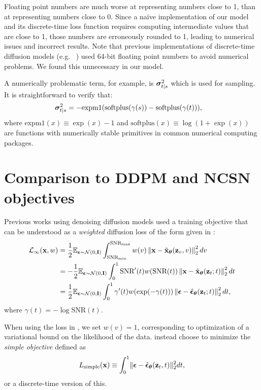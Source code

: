 \documentclass{article}
\newcommand{\bsst}{\bsigma_{t|s}}
\newcommand{\snr}{\text{SNR}}
\begin{document}
Floating point numbers are much worse at representing numbers close to 1, than at representing numbers close to 0. Since a na\"ive implementation of our model and its discrete-time loss function requires computing intermediate values that are close to 1, those numbers are erroneously rounded to 1, leading to numerical issues and incorrect results. Note that previous implementations of discrete-time diffusion models (e.g. ~\citep{ho2020denoising}) used 64-bit floating point numbers to avoid numerical problems. We found this unnecessary in our model.

A numerically problematic term, for example, is $\bsst^2$ which is used for sampling. It is straightforward to verify that:
\begin{align}
\bsst^2 &= -\text{expm1}(\text{softplus}(\gamma(s))-\text{softplus}(\gamma(t))),
\end{align}
where $\text{expm1}(x) \equiv \exp(x) - 1$ and $\text{softplus}(x) \equiv \log(1 + \exp(x))$ are functions with numerically stable primitives in common numerical computing packages. 

\section{Comparison to DDPM and NCSN objectives}
\label{sec:ncsn_ddpm_weights}
Previous works using denoising diffusion models \citep{ho2020denoising, song2019generative, nichol2021improved} used a training objective that can be understood as a \emph{weighted} diffusion loss of the form given in :
\begin{align}
\mathcal{L}_{\infty}(\rvx, w) &= \frac{1}{2}\E_{\bepsilon\sim\mathcal{N}(0,\bfI)} \int_{\snr_{\text{min}}}^{\snr_{\text{max}}} w(v) \left\rVert \rvx - \tilde{\rvx}_{\bT}(\rvz_v, v) \right\lVert_{2}^{2} dv \label{eq:weighted_diff_app}\\
&= -\frac{1}{2}\E_{\bepsilon\sim\mathcal{N}(0,\bfI)} \int_{0}^{1} \snr'(t)w(\snr(t)) \left\rVert \rvx - \hat{\rvx}_{\bT}(\rvz_t;t) \right\lVert_{2}^{2} dt\\
&= \frac{1}{2}\E_{\bepsilon\sim\mathcal{N}(0,\bfI)} \int_{0}^{1} \gamma'(t)w(\exp(-\gamma(t))) \left\rVert \bepsilon - \hat{\bepsilon}_{\bT}(\rvz_t;t) \right\lVert_{2}^{2} dt,\label{eq:weighted_gamma_loss}
\end{align}
where $\gamma(t)=-\log\snr(t)$.

When using the loss in , we set $w(v)=1$, corresponding to optimization of a variational bound on the likelihood of the data. \cite{ho2020denoising, song2019generative,nichol2021improved} instead choose to minimize the \emph{simple objective} defined as
\begin{align}
L_{\text{simple}}({\mathbf{x}}) \equiv \int_{0}^{1} \lVert {\boldsymbol{\epsilon}} - \hat{{\boldsymbol{\epsilon}}}_{{\boldsymbol{\theta}}}({\mathbf{z}}_{t}, t)\rVert_{2}^{2} dt,
\label{eq:simple_loss}
\end{align}
or a discrete-time version of this.
\end{document}
